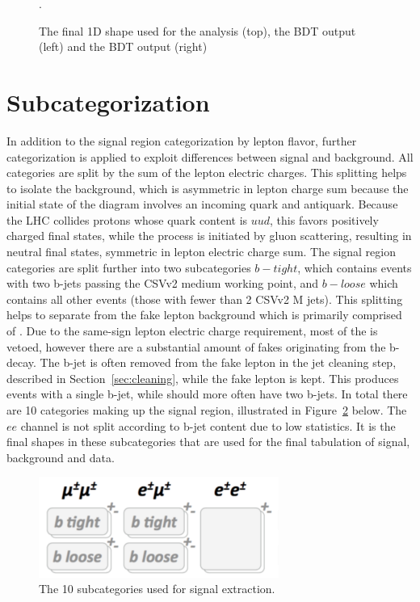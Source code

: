 \begin{figure}[htp]
\caption[Data to MC comparison of final shapes]{The final 1D shape used for the analysis (top), the \ttbar BDT output (left) and the \ttv BDT output (right)}.
\label{fig:final_shapes_prefit}
\end{figure}


\section{Subcategorization}
In addition to the signal region categorization by lepton flavor, further categorization is applied to exploit differences between signal and background. All categories are
split by the sum of the lepton electric charges. This splitting helps to isolate the \ttw background, which is asymmetric in lepton charge sum because the initial state of the
diagram involves an incoming quark and antiquark. Because the LHC collides protons whose quark content is $uud$, this favors positively charged final states, while the \tth process
is initiated by gluon scattering, resulting in neutral final states, symmetric in lepton electric charge sum.
The signal region categories
are split further into two subcategories $b-tight$, which contains events with two b-jets passing the CSVv2 medium working point, and $b-loose$ which contains all other events
(those with fewer than 2 CSVv2 M jets). This splitting helps to separate \tth from the fake lepton background which is primarily comprised of \ttbar. Due to the same-sign 
lepton electric charge requirement, most of the \ttbar is vetoed, however there are a substantial amount of fakes originating from the b-decay. The b-jet is often removed
from the fake lepton in the jet cleaning step, described in Section~\ref{sec:cleaning}, while the fake lepton is kept. This produces events with a single b-jet, while \tth should more often have two b-jets. In total there are 10 categories
making up the signal region, illustrated in Figure~\ref{fig:subcats} below. The $ee$ channel is not split according to b-jet content due to low statistics. 
It is the final shapes in these subcategories that are used for the final tabulation of signal, background and data. 

\begin{figure}[htp]
\centering
\includegraphics[width=0.7\textwidth]{ch8_figs/subcats.pdf}
\caption[Sub categories used for signal extraction]{The 10 subcategories used for signal extraction.}
\label{fig:subcats}
\end{figure}


